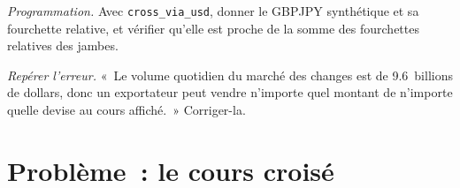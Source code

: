 \begin{exercise}[$\star\star\star$]\label{exo:m2:the-fx-market:7}
\emph{Programmation.} Avec \texttt{cross\_via\_usd}, donner le GBPJPY synthétique et sa
fourchette relative, et vérifier qu'elle est proche de la somme des fourchettes relatives des
jambes.
\end{exercise}

\begin{exercise}[$\star\star\star$]\label{exo:m2:the-fx-market:8}
\emph{Repérer l'erreur.} «~Le volume quotidien du marché des changes est de 9.6~billions de dollars, donc un exportateur peut
vendre n'importe quel montant de n'importe quelle devise au cours affiché.~» Corriger-la.
\end{exercise}

\section{Problème~: le cours croisé}

